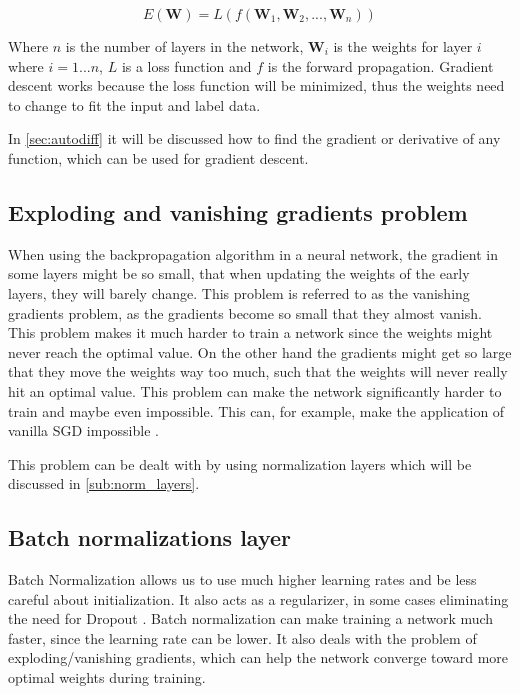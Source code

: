 $$E(\bm{W}) = L(f(\bm{W}_1, \bm{W}_2, ..., \bm{W}_n))$$

Where $n$ is the number of layers in the network, $\bm{W}_i$ is the weights for layer $i$ where $i = 1...n$, $L$ is a loss function and $f$ is the forward propagation.
Gradient descent works because the loss function will be minimized, thus the weights need to change to fit the input and label data.

In \autoref{sec:autodiff} it will be discussed how to find the gradient or derivative of any function, which can be used for gradient descent.

\subsection{Exploding and vanishing gradients problem}

When using the backpropagation algorithm in a neural network, the gradient in some layers might be so small, that when updating the weights of the early layers, they will barely change. This problem is referred to as the vanishing gradients problem, as the gradients become so small that they almost vanish.
This problem makes it much harder to train a network since the weights might never reach the optimal value.
On the other hand the gradients might get so large that they move the weights way too much, such that the weights will never really hit an optimal value.
This problem can make the network significantly harder to train and maybe even impossible. This can, for example, make the application of vanilla SGD impossible \cite{exploding_gradients}.

This problem can be dealt with by using normalization layers which will be discussed in \autoref{sub:norm_layers}.



\subsection{Batch normalizations layer}%
\label{sub:norm_layers}

Batch Normalization allows us to use much higher learning rates and
be less careful about initialization. It also acts as a regularizer,
in some cases eliminating the need for Dropout \cite{batch_norm}.
Batch normalization can make training a network much faster, since the learning rate can be lower.
It also deals with the problem of exploding/vanishing gradients, which can help the network converge toward more optimal weights during training.

